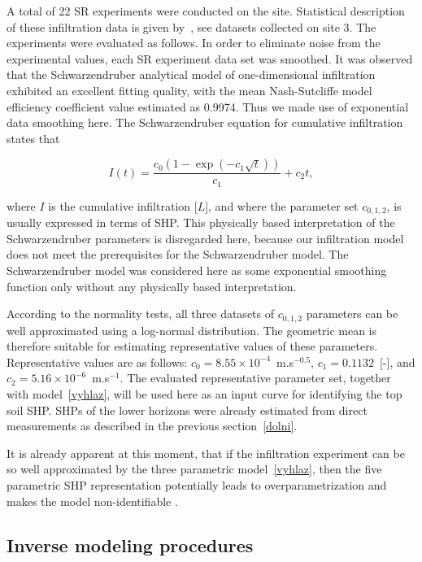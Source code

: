 \documentclass[review]{elsarticle}
\newenvironment{lineq}
    {\begin{linenomath*}
    \begin{equation}
    }
    { 
    \end{equation} 
    \end{linenomath*}
    }
\begin{document}
A total of 22 SR experiments were conducted on the site. Statistical description of these infiltration data is given by~\citep{jacka-site}, see datasets collected on site 3. The experiments were evaluated as follows. In order to eliminate noise from the experimental values, each SR experiment data set was smoothed. It was observed that the Schwarzendruber analytical model of one-dimensional infiltration exhibited an excellent fitting quality, with the mean  Nash-Sutcliffe model efficiency coefficient value estimated as 0.9974. Thus we made use of  exponential data smoothing here. The Schwarzendruber equation for cumulative infiltration  states that
\begin{lineq}
I(t)=\frac{c_0\left(1-\exp\left(-c_1\sqrt{t}\right)\right)}{c_1}+c_2t,
\label{vyhlaz}
\end{lineq}
where $I$ is the cumulative infiltration [$L$], and where the parameter set $c_{0,1,2}$, is usually expressed in terms of SHP. This physically based interpretation of the Schwarzendruber parameters is disregarded here, because our infiltration model does not meet the prerequisites for the Schwarzendruber model. The Schwarzendruber model was  considered here as some exponential smoothing function only without any physically  based interpretation.


According to the normality tests,  all three datasets of $c_{0,1,2}$ parameters can be well approximated  using a log-normal distribution. The geometric mean is therefore suitable for estimating representative values of these parameters. Representative values are as follows: $c_0 = 8.55\times 10^{-4}$~m.s$^{-0.5}$, $c_1 = 0.1132$~[-], and $c_2 = 5.16\times 10^{-6}$~m.s$^{-1}$. The evaluated representative  parameter set, together with  model~\eqref{vyhlaz}, will be used here as an input curve for identifying the top soil SHP. SHPs of the lower horizons were already estimated from direct measurements as described in the previous section~\ref{dolni}.

It is already apparent at this moment, that if the infiltration experiment can be so well approximated by the three parametric model~\eqref{vyhlaz}, then the five parametric SHP representation potentially leads to overparametrization and makes the model non-identifiable \citep{bellman1970}.  






\subsection{Inverse modeling procedures}
\label{invproc}
\end{document}
